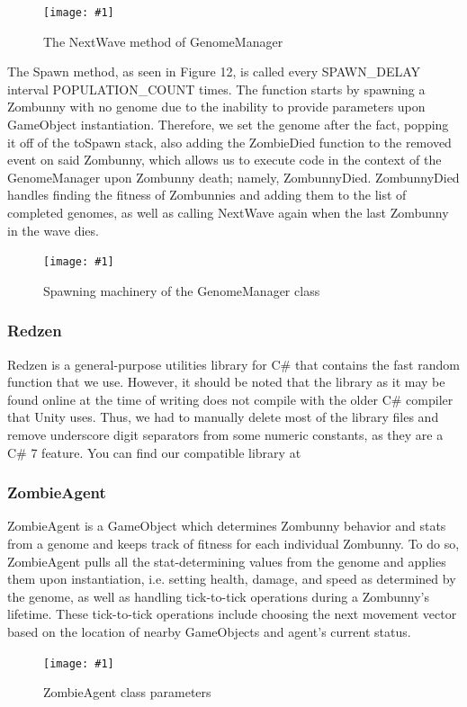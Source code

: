 \documentclass[letterpaper]{article}
\def\imfig#1#2{\begin{figure}[h] \centering \texttt{[image: \#1]} \caption{#2} \end{figure}}
\begin{document}
\imfig{GenomeManagerNextWave}{The NextWave method of GenomeManager}

The Spawn method, as seen in Figure 12, is called every SPAWN\_DELAY interval POPULATION\_COUNT times. The function starts by spawning a Zombunny with no genome due to the inability to provide parameters upon GameObject instantiation. Therefore, we set the genome after the fact, popping it off of the toSpawn stack, also adding the ZombieDied function to the removed event on said Zombunny, which allows us to execute code in the context of the GenomeManager upon Zombunny death; namely, ZombunnyDied. ZombunnyDied handles finding the fitness of Zombunnies and adding them to the list of completed genomes, as well as calling NextWave again when the last Zombunny in the wave dies.

\imfig{GenomeManagerSpawn}{Spawning machinery of the GenomeManager class}

\subsubsection{Redzen}

Redzen is a general-purpose utilities library for C\# that contains the fast random function that we use. However, it should be noted that the library as it may be found online at the time of writing does not compile with the older C\# compiler that Unity uses. Thus, we had to manually delete most of the library files and remove underscore digit separators from some numeric constants, as they are a C\# 7 feature. You can find our compatible library at 

\subsubsection{ZombieAgent}

ZombieAgent is a GameObject which determines Zombunny behavior and stats from a genome and keeps track of fitness for each individual Zombunny. To do so, ZombieAgent pulls all the stat-determining values from the genome and applies them upon instantiation, i.e. setting health, damage, and speed as determined by the genome, as well as handling tick-to-tick operations during a Zombunny's lifetime. These tick-to-tick operations include choosing the next movement vector based on the location of nearby GameObjects and agent's current status. 

\imfig{ZombieAgent1}{ZombieAgent class parameters}
\end{document}
